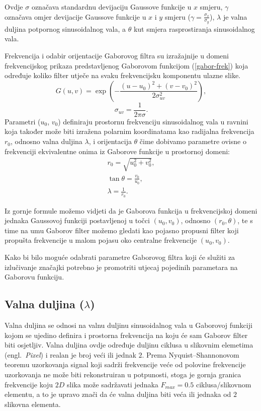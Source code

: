 \documentclass{article}
\newcommand{\engl}[1]{(engl.~\emph{#1})}
\begin{document}
Ovdje $\sigma$ označava standardnu devijaciju Gaussove funkcije u $x$ smjeru,
$\gamma$ označava omjer devijacije Gaussove funkcije u $x$ i $y$ smjeru ($\gamma =
\frac{\sigma_x}{\sigma_y}$), $\lambda$ je valna duljina potpornog sinusoidalnog
vala, a $\theta$ kut smjera rasprostiranja sinusoidalnog vala.

Frekvencija i odabir orijentacije Gaborovog filtra su izražajnije u
domeni frekvencijskog prikaza predstavljenog Gaborovom funkcijom (\ref{gabor-frek}) koja
određuje koliko filter utječe na svaku frekvencijsku komponentu ulazne slike.
\begin{equation}
G(u,v) = \exp \left ( - \frac{(u-u_0)^2 + (v-v_0)^2}{2\sigma^2_{uv}}\right ),
\label{gabor-frek}
\end{equation}
\begin{equation}
\sigma_{uv} = \frac{1}{2\pi \sigma}.
\end{equation}
Parametri ($u_0$, $v_0$) definiraju prostornu frekvenciju sinusoidalnog vala u
ravnini koja također može biti izražena polarnim koordinatama kao radijalna
frekvencija $r_0$, odnosno valna duljina $\lambda$, i orijentacija $\theta$ čime
dobivamo parametre ovisne o frekvenciji ekvivalentne onima iz Gaborove funkcije u prostornoj
domeni:
\begin{eqnarray}
r_0 = \sqrt{u_0^2 + v_0^2}, \\
\tan \theta = \frac{v_0}{u_0}, \\
\lambda = \frac{1}{r_0}.
\end{eqnarray}

Iz gornje formule možemo vidjeti da je Gaborova funkcija u frekvencijskoj domeni
jednaka Gaussovoj funkciji postavljenoj u točci $(u_0, v_0)$, odnosno $(r_0,
\theta)$, te s time na umu Gaborov filter možemo gledati kao pojasno propusni
filter koji propušta frekvencije u malom pojasu oko centralne frekvencije $(u_0,
v_0)$.

Kako bi bilo moguće odabrati parametre Gaborovog filtra koji će služiti
za izlučivanje značajki potrebno je promotriti utjecaj pojedinih parametara na
Gaborovu funkciju.

\subsection{Valna duljina ($\lambda$)}
Valna duljina se odnosi na valnu duljinu sinusoidalnog vala u Gaborovoj funkciji
kojom se ujedino definira i prostorna frekvencija na koju će sam Gaborov filter
biti osjetljiv. Valna duljina ovdje određuje duljinu ciklusa u slikovnim
elemetima \engl{Pixel} i realan je broj veći ili jednak $2$. Prema
Nyquist--Shannonovom teoremu uzorkovanja signal koji sadrži frekvencije veće od
polovine frekvencije uzorkovanja ne može biti rekonstruiran u potpunosti, stoga
je gornja granica frekvencije koju $2D$ slika može sadržavati jednaka $F_{max} =
0.5$ ciklusa/slikovnom elementu, a to je upravo znači da će valna duljina
biti veća ili jednaka od $2$ slikovna elementa.
\end{document}
